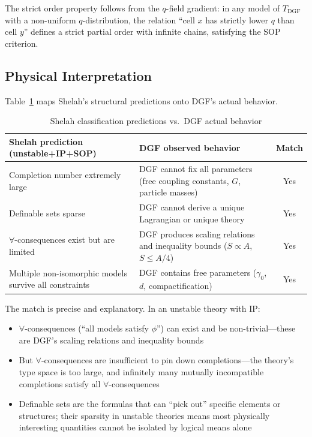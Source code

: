 \documentclass[12pt,a4paper]{article}
\theoremstyle{definition}
\theoremstyle{remark}
\begin{document}
The strict order property follows from the $q$-field gradient: in any model of $T_{\mathrm{DGF}}$ with a non-uniform $q$-distribution, the relation ``cell $x$ has strictly lower $q$ than cell $y$'' defines a strict partial order with infinite chains, satisfying the SOP criterion.

\subsection{Physical Interpretation}

Table~\ref{tab:shelah_map} maps Shelah's structural predictions onto DGF's actual behavior.

\begin{table}[htbp]
\centering
\caption{Shelah classification predictions vs.\ DGF actual behavior}
\label{tab:shelah_map}
\begin{tabular}{p{}p{}c}
\toprule
\textbf{Shelah prediction (unstable+IP+SOP)} & \textbf{DGF observed behavior} & \textbf{Match} \\
\midrule
Completion number extremely large & DGF cannot fix all parameters (free coupling constants, $G$, particle masses) & Yes \\
Definable sets sparse & DGF cannot derive a unique Lagrangian or unique theory & Yes \\
$\forall$-consequences exist but are limited & DGF produces scaling relations and inequality bounds ($S \propto A$, $S \leq A/4$) & Yes \\
Multiple non-isomorphic models survive all constraints & DGF contains free parameters ($\gamma_0$, $d$, compactification) & Yes \\
\bottomrule
\end{tabular}
\end{table}

The match is precise and explanatory. In an unstable theory with IP:
\begin{itemize}[leftmargin=*,itemsep=0pt,topsep=0pt]
\item $\forall$-consequences (``all models satisfy $\phi$'') can exist and be non-trivial---these are DGF's scaling relations and inequality bounds
\item But $\forall$-consequences are insufficient to pin down completions---the theory's type space is too large, and infinitely many mutually incompatible completions satisfy all $\forall$-consequences
\item Definable sets are the formulas that can ``pick out'' specific elements or structures; their sparsity in unstable theories means most physically interesting quantities cannot be isolated by logical means alone
\end{itemize}
\end{document}
